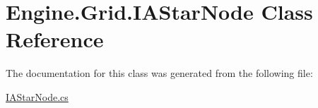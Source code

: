 \hypertarget{a00410}{}\section{Engine.\+Grid.\+I\+A\+Star\+Node Class Reference}
\label{a00410}


The documentation for this class was generated from the following file\+:\begin{DoxyCompactItemize}
\item 
\hyperlink{a00089}{I\+A\+Star\+Node.\+cs}\end{DoxyCompactItemize}
